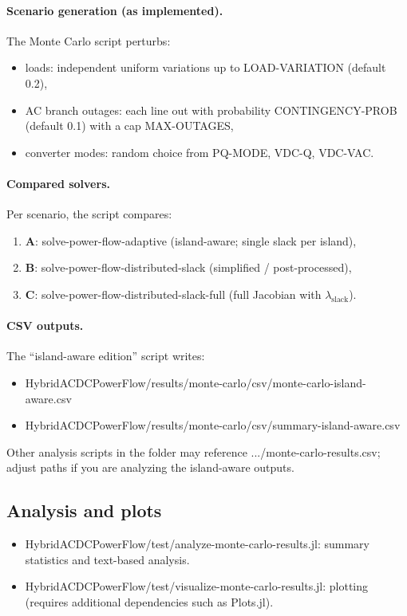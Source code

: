\documentclass[11pt]{article}
\def\code#1{#1}%
\def\file#1{#1}%
\def\_{-}%
\newcommand{\code}[1]{\nolinkurl{#1}}
\newcommand{\file}[1]{\path{#1}}
\begin{document}
\paragraph{Scenario generation (as implemented).}
The Monte Carlo script perturbs:
\begin{itemize}[leftmargin=*]
  \item loads: independent uniform variations up to \code{LOAD\_VARIATION} (default 0.2),
  \item AC branch outages: each line out with probability \code{CONTINGENCY\_PROB} (default 0.1) with a cap \code{MAX\_OUTAGES},
  \item converter modes: random choice from \code{PQ\_MODE}, \code{VDC\_Q}, \code{VDC\_VAC}.
\end{itemize}

\paragraph{Compared solvers.}
Per scenario, the script compares:
\begin{enumerate}[leftmargin=*]
  \item \textbf{A}: \code{solve\_power\_flow\_adaptive} (island-aware; single slack per island),
  \item \textbf{B}: \code{solve\_power\_flow\_distributed\_slack} (simplified / post-processed),
  \item \textbf{C}: \code{solve\_power\_flow\_distributed\_slack\_full} (full Jacobian with $\lambda_{\text{slack}}$).
\end{enumerate}

\paragraph{CSV outputs.}
The ``island-aware edition'' script writes:
\begin{itemize}[leftmargin=*]
  \item \file{HybridACDCPowerFlow/results/monte\_carlo/csv/monte\_carlo\_island\_aware.csv}
  \item \file{HybridACDCPowerFlow/results/monte\_carlo/csv/summary\_island\_aware.csv}
\end{itemize}
Other analysis scripts in the folder may reference \file{.../monte\_carlo\_results.csv}; adjust paths if you are analyzing the island-aware outputs.

\subsection{Analysis and plots}
\begin{itemize}[leftmargin=*]
  \item \file{HybridACDCPowerFlow/test/analyze\_monte\_carlo\_results.jl}: summary statistics and text-based analysis.
  \item \file{HybridACDCPowerFlow/test/visualize\_monte\_carlo\_results.jl}: plotting (requires additional dependencies such as \code{Plots.jl}).
\end{itemize}
\end{document}
